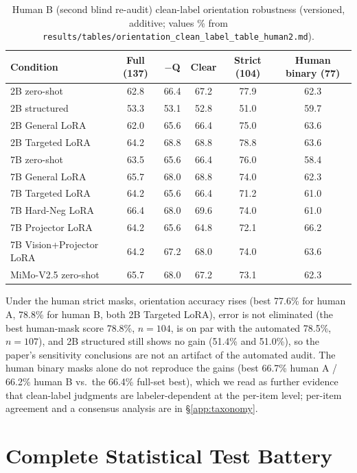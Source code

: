 \begin{table}[h]
\centering
\footnotesize
\caption{Human B (second blind re-audit) clean-label orientation robustness
(versioned, additive; values \% from
\texttt{results/tables/orientation\_clean\_label\_table\_human2.md}).}
\label{tab:cleanlabel-human2}
\begin{tabular}{lccccc}
\toprule
Condition & Full (137) & $-$Q & Clear & Strict (104) & Human binary (77) \\
\midrule
2B zero-shot & 62.8 & 66.4 & 67.2 & 77.9 & 62.3 \\
2B structured & 53.3 & 53.1 & 52.8 & 51.0 & 59.7 \\
2B General LoRA & 62.0 & 65.6 & 66.4 & 75.0 & 63.6 \\
2B Targeted LoRA & 64.2 & 68.8 & 68.8 & 78.8 & 63.6 \\
7B zero-shot & 63.5 & 65.6 & 66.4 & 76.0 & 58.4 \\
7B General LoRA & 65.7 & 68.0 & 68.8 & 74.0 & 62.3 \\
7B Targeted LoRA & 64.2 & 65.6 & 66.4 & 71.2 & 61.0 \\
7B Hard-Neg LoRA & 66.4 & 68.0 & 69.6 & 74.0 & 61.0 \\
7B Projector LoRA & 64.2 & 65.6 & 64.8 & 72.1 & 66.2 \\
7B Vision+Projector LoRA & 64.2 & 67.2 & 68.0 & 74.0 & 63.6 \\
MiMo-V2.5 zero-shot & 65.7 & 68.0 & 67.2 & 73.1 & 62.3 \\
\bottomrule
\end{tabular}
\end{table}
Under the human strict masks, orientation accuracy rises (best 77.6\% for
human A, 78.8\% for human B, both 2B Targeted LoRA), error is not eliminated
(the best human-mask score 78.8\%, $n{=}104$, is on par with the automated
78.5\%, $n{=}107$), and 2B structured still shows no gain (51.4\% and 51.0\%),
so the paper's sensitivity conclusions are not an artifact of the automated
audit. The human binary masks alone do not reproduce the gains (best 66.7\%
human A / 66.2\% human B vs.\ the 66.4\% full-set best), which we read as
further evidence that clean-label judgments are labeler-dependent at the
per-item level; per-item agreement and a consensus analysis are in
\S\ref{app:taxonomy}.

\section{Complete Statistical Test Battery}
\label{app:stats}

